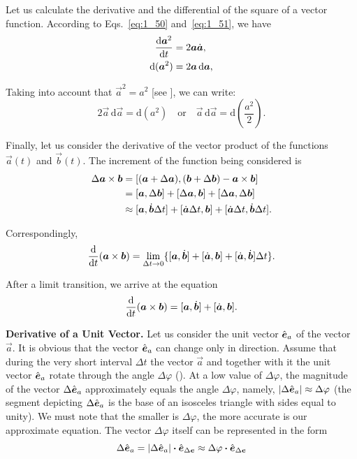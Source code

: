Let us calculate the derivative and the differential of the square of a vector function. According to Eqs.~\eqref{eq:1_50} and~\eqref{eq:1_51}, we have
\begin{align}
\frac{\mathrm{d}\boldsymbol{a}^2}{\mathrm{d} t} &= 2\boldsymbol{a}\dot{\boldsymbol{a}},\label{eq:1_52}\\
\mathrm{d}(\boldsymbol{a}^2) &= 2\boldsymbol{a}\,\mathrm{d}\boldsymbol{a},\label{eq:1_53}
\end{align}

\noindent
Taking into account that $\vec{a}^2 = a^2$ [see ], we can write:
\begin{equation}\label{eq:1_54}
2\vec{a}\,\mathrm{d}\vec{a} = \mathrm{d}(a^2) \quad \text{or} \quad \vec{a}\,\mathrm{d}\vec{a} = \mathrm{d}\left(\frac{a^2}{2}\right).
\end{equation}

Finally, let us consider the derivative of the vector product of the functions $\vec{a}(t)$ and $\vec{b}(t)$. The increment of the function being considered is
\begin{align*}
\Delta\boldsymbol{a}\times\boldsymbol{b} &= [(\boldsymbol{a} + \Delta\boldsymbol{a}),(\boldsymbol{b} + \Delta\boldsymbol{b}) - \boldsymbol{a}\times\boldsymbol{b}]\\
&= [\boldsymbol{a},\Delta\boldsymbol{b}] + [\Delta\boldsymbol{a},\boldsymbol{b}] + [\Delta\boldsymbol{a},\Delta\boldsymbol{b}]\\
&\approx [\boldsymbol{a},\dot{\boldsymbol{b}}\Delta t] + [\dot{\boldsymbol{a}}\Delta t,\boldsymbol{b}] + [\dot{\boldsymbol{a}}\Delta t,\dot{\boldsymbol{b}}\Delta t].
\end{align*}

\noindent
Correspondingly,
\begin{equation*}
\frac{\mathrm{d}}{\mathrm{d} t}(\boldsymbol{a}\times\boldsymbol{b}) = \lim_{\Delta t\to 0} \{[\boldsymbol{a},\dot{\boldsymbol{b}}] + [\dot{\boldsymbol{a}},\boldsymbol{b}] + [\dot{\boldsymbol{a}},\dot{\boldsymbol{b}}]\Delta t\}.
\end{equation*}

\noindent
After a limit transition, we arrive at the equation
\begin{equation}\label{eq:1_55}
\frac{\mathrm{d}}{\mathrm{d} t}(\boldsymbol{a}\times\boldsymbol{b}) = [\boldsymbol{a},\dot{\boldsymbol{b}}] + [\dot{\boldsymbol{a}},\boldsymbol{b}].
\end{equation}

\textbf{Derivative of a Unit Vector.} Let us consider the unit vector $\hat{\boldsymbol{e}}_{a}$ of the vector $\vec{a}$. It is obvious that the vector $\hat{\boldsymbol{e}}_{a}$ can change only in direction. Assume that during the very short interval $\Delta t$ the vector $\vec{a}$ and together with it the unit vector $\hat{\boldsymbol{e}}_{a}$ rotate through the angle $\Delta\varphi$ (). At a low value of $\Delta\varphi$, the magnitude of the vector $\Delta\hat{\boldsymbol{e}}_{a}$ approximately equals the angle $\Delta\varphi$, namely, $|\Delta\hat{\boldsymbol{e}}_{a}|\approx\Delta\varphi$ (the segment depicting $\Delta\hat{\boldsymbol{e}}_{a}$ is the base of an isosceles triangle with sides equal to unity). We must note that the smaller is $\Delta\varphi$, the more accurate is our approximate equation. The vector $\Delta\varphi$ itself can be represented in the form
\begin{equation*}
\Delta\hat{\boldsymbol{e}}_{a} = |\Delta\hat{\boldsymbol{e}}_{a}| \boldsymbol{\cdot} \hat{\boldsymbol{e}}_{\Delta\boldsymbol{e}} \approx \Delta\varphi \boldsymbol{\cdot} \hat{\boldsymbol{e}}_{\Delta\boldsymbol{e}}
\end{equation*}

